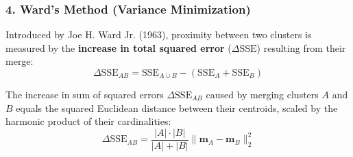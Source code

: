 \subsubsection{4. Ward's Method (Variance Minimization)}
Introduced by Joe H. Ward Jr. (1963), proximity between two clusters is measured by the \textbf{increase in total squared error} ($\Delta \mathrm{SSE}$) resulting from their merge:
\begin{equation}
    \Delta \mathrm{SSE}_{AB} = \mathrm{SSE}_{A \cup B} - (\mathrm{SSE}_A + \mathrm{SSE}_B)
    \label{eq:dm-ward-delta-def-en}
\end{equation}

\begin{theorem}
The increase in sum of squared errors $\Delta \mathrm{SSE}_{AB}$ caused by merging clusters $A$ and $B$ equals the squared Euclidean distance between their centroids, scaled by the harmonic product of their cardinalities:
\begin{equation}
    \Delta \mathrm{SSE}_{AB} = \frac{|A| \cdot |B|}{|A| + |B|} \|\mathbf{m}_A - \mathbf{m}_B\|_2^2
    \label{eq:dm-ward-formula-closed-en}
\end{equation}
\end{theorem}

